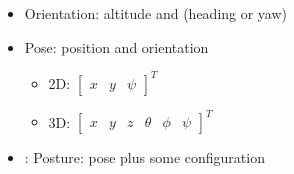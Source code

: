 \documentclass[../main.tex]{subfiles}
\begin{document}
\begin{itemize}
    \item Orientation: altitude and (heading or yaw)
    \item Pose: position and orientation
    \begin{itemize}
      \item 2D: $\begin{bmatrix} x & y & \psi \end{bmatrix}^{T}$
      \item 3D: $\begin{bmatrix} x & y & z & \theta & \phi & \psi \end{bmatrix}^{T}$
    \end{itemize}
    \item: Posture: pose plus some configuration
  \end{itemize}
\end{document}
